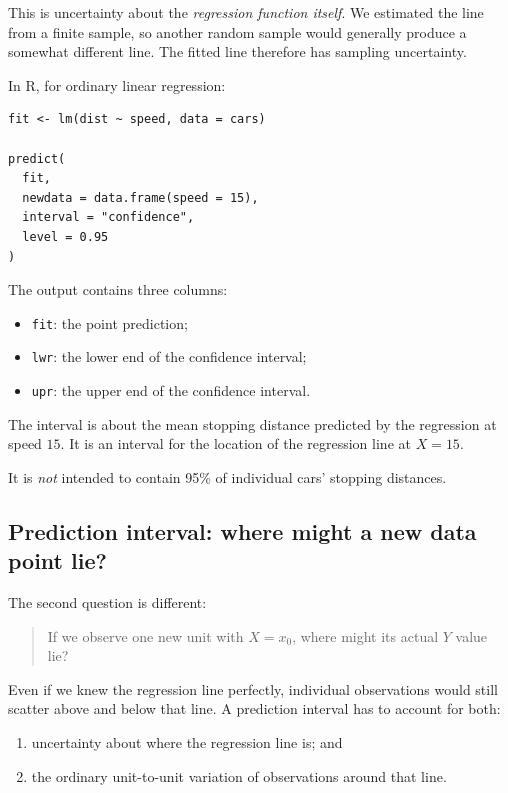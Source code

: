 \documentclass[11pt]{report}
\begin{document}
This is uncertainty about the \emph{regression function itself}. We estimated the line from a finite sample, so another random sample would generally produce a somewhat different line. The fitted line therefore has sampling uncertainty.

In R, for ordinary linear regression:

\begin{lstlisting}
fit <- lm(dist ~ speed, data = cars)

predict(
  fit,
  newdata = data.frame(speed = 15),
  interval = "confidence",
  level = 0.95
)
\end{lstlisting}

The output contains three columns:

\begin{itemize}
    \item \texttt{fit}: the point prediction;
    \item \texttt{lwr}: the lower end of the confidence interval;
    \item \texttt{upr}: the upper end of the confidence interval.
\end{itemize}

The interval is about the mean stopping distance predicted by the regression at speed \(15\). It is an interval for the location of the regression line at \(X=15\).

It is \emph{not} intended to contain 95\% of individual cars' stopping distances.

\subsection{Prediction interval: where might a new data point lie?}

The second question is different:

\begin{quote}
If we observe one new unit with \(X=x_0\), where might its actual \(Y\) value lie?
\end{quote}

Even if we knew the regression line perfectly, individual observations would still scatter above and below that line. A prediction interval has to account for both:

\begin{enumerate}
    \item uncertainty about where the regression line is; and
    \item the ordinary unit-to-unit variation of observations around that line.
\end{enumerate}
\end{document}

